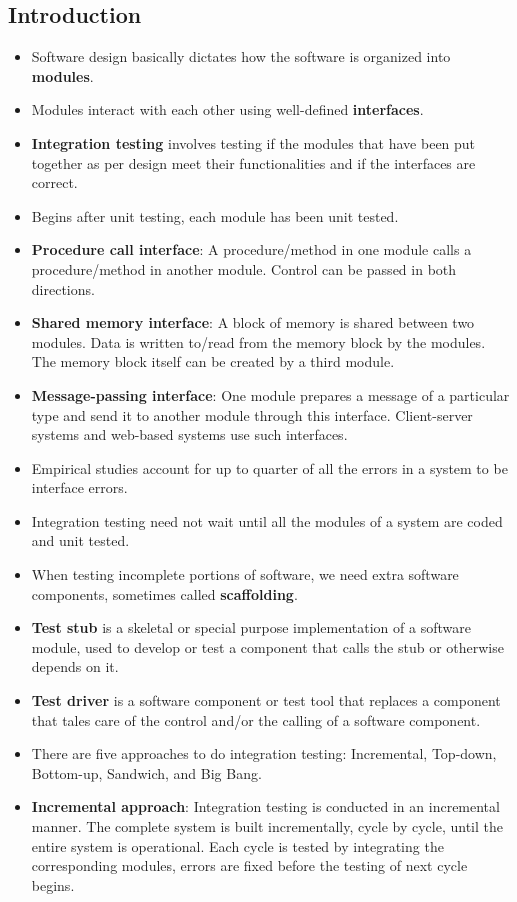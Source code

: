 \documentclass[a4paper]{article}
\begin{document}
\subsection{Introduction}
\begin{itemize}
    \item Software design basically dictates how the software is organized into \textbf{modules}.
    \item Modules interact with each other using well-defined \textbf{interfaces}.
    \item \textbf{Integration testing} involves testing if the modules that have been put together as per design meet their functionalities and if the interfaces are correct.
    \item Begins after unit testing, each module has been unit tested.
    \item \textbf{Procedure call interface}: A procedure/method in one module calls a procedure/method in another module. Control can be passed in both directions.
    \item \textbf{Shared memory interface}: A block of memory is shared between two modules. Data is written to/read from the memory block by the modules. The memory block itself can be created by a third module.
    \item \textbf{Message-passing interface}: One module prepares a message of a particular type and send it to another module through this interface. Client-server systems and web-based systems use such interfaces.
    \item Empirical studies account for up to quarter of all the errors in a system to be interface errors.
    \item Integration testing need not wait until all the modules of a system are coded and unit tested.
    \item When testing incomplete portions of software, we need extra software components, sometimes called \textbf{scaffolding}.
    \item \textbf{Test stub} is a skeletal or special purpose implementation of a software module, used to develop or test a component that calls the stub or otherwise depends on it.
    \item \textbf{Test driver} is a software component or test tool that replaces a component that tales care of the control and/or the calling of a software component.
    \item There are five approaches to do integration testing: Incremental, Top-down, Bottom-up, Sandwich, and Big Bang.
    \item \textbf{Incremental approach}: Integration testing is conducted in an incremental manner. The complete system is built incrementally, cycle by cycle, until the entire system is operational. Each cycle is tested by integrating the corresponding modules, errors are fixed before the testing of next cycle begins.

\end{itemize}
\end{document}
